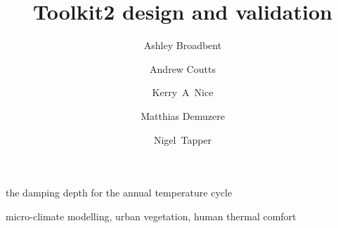 \documentclass[final,3p,times,authoryear]{elsarticle}
\begin{document}
 the damping depth for the annual temperature cycle


\begin{frontmatter}



\title{Toolkit2 design and validation}


\author[monash,crc]{Ashley Broadbent}
\author[monash,crc]{Andrew Coutts}
\author[monash,crc]{Kerry~A~Nice}
\author[ku,crc]{Matthias Demuzere}
\author[monash,crc]{Nigel~Tapper}
\address[monash]{School of Earth, Atmosphere and Environment, Monash University, Clayton, VIC 3800, Australia}
\address[crc]{Cooperative Research Centre for Water Sensitive Cities, Melbourne, Australia}
\address[ku]{KU Leuven, Department of Earth and Environmental Sciences, Celestijnenlaan 200E, 3001 Leuven, Belgium}

\begin{abstract}



\end{abstract}

\begin{keyword}
micro-climate modelling, urban vegetation, human thermal comfort



\end{keyword}

\end{frontmatter}
\end{document}
